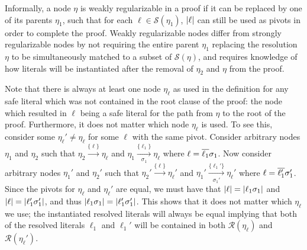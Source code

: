 Informally, a node $\eta$ is weakly regularizable in a proof if it can be replaced by one of its parents $\eta_1$, such that for each $\ell \in \mathcal{S}(\eta_1)$, $\lvert\ell\rvert$ can still be used as pivots in order to complete the proof. Weakly regularizable nodes differ from strongly regularizable nodes by not requiring the entire parent $\eta_1$ replacing the resolution $\eta$ to be simultaneously matched to a subset of $\mathcal{S}(\eta)$, and requires knowledge of how literals will be instantiated after the removal of $\eta_2$ and $\eta$ from the proof.

Note that there is always at least one node $\eta_\ell$ as used in the definition for any safe literal which was not contained in the root clause of the proof: the node which resulted in $\ell$ being a safe literal for the path from $\eta$ to the root of the proof. Furthermore, it does not matter which node $\eta_\ell$ is used. To see this, consider some $\eta_\ell' \neq \eta_\ell$ for some $\ell$ with the same pivot. Consider arbitrary nodes $\eta_1$ and $\eta_2$ such that  $\eta_2 \xrightarrow[ ]{\{\ell\} } \eta_\ell$ and $\eta_1 \xrightarrow[\sigma_1]{\{\ell_1\} } \eta_\ell$ where $\ell=\overline{\ell_1}\sigma_1$. Now consider arbitrary nodes $\eta_1'$ and $\eta_2'$ such that  $\eta_2' \xrightarrow[ ]{\{\ell\} } \eta_\ell'$ and $\eta_1' \xrightarrow[\sigma_1']{\{\ell_1'\} } \eta_\ell'$ where $\ell=\overline{\ell_1'}\sigma_1'$. Since the pivots for $\eta_\ell$ and $\eta_\ell'$ are equal, we must have that %
$\lvert\ell\rvert=\lvert\ell_1\sigma_1\rvert$ and $\lvert\ell\rvert=\lvert\ell_1'\sigma_1'\rvert$, and thus $\lvert\ell_1\sigma_1\rvert=\lvert\ell_1'\sigma_1'\rvert$. This shows that it does not matter which $\eta_\ell$ we use; the instantiated resolved literals will always be equal implying that both of the resolved literals $\ell_1$ and $\ell_1'$ will be contained in both $\mathcal{R}(\eta_\ell)$ and $\mathcal{R}(\eta_\ell')$.


